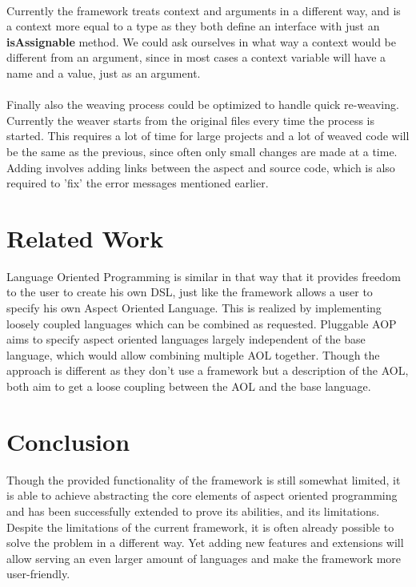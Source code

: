 \documentclass[a4paper]{report}
\begin{document}
\\
Currently the framework treats context and arguments in a different way, and is a context more equal to a type as they both define an interface with just an \textbf{isAssignable} method. We could ask ourselves in what way a context would be different from an argument, since in most cases a context variable will have a name and a value, just as an argument.\\
\\
Finally also the weaving process could be optimized to handle quick re-weaving. Currently the weaver starts from the original files every time the process is started. This requires a lot of time for large projects and a lot of weaved code will be the same as the previous, since often only small changes are made at a time. Adding involves adding links between the aspect and source code, which is also required to 'fix' the error messages mentioned earlier.

\chapter{Related Work}
Language Oriented Programming \citep{dmitriev_language_2004} is similar in that way that it provides freedom to the user to create his own DSL, just like the framework allows a user to specify his own Aspect Oriented Language. This is realized by implementing loosely coupled languages which can be combined as requested. Pluggable AOP \citep{kojarski_pluggable_2005} aims to specify aspect oriented languages largely independent of the base language, which would allow combining multiple AOL together.  Though the approach is different as they don't use a framework but a description of the AOL, both aim to get a loose coupling between the AOL and the base language. 

\chapter{Conclusion}
Though the provided functionality of the framework is still somewhat limited, it is able to achieve abstracting the core elements of aspect oriented programming and has been successfully extended to prove its abilities, and its limitations. Despite the limitations of the current framework, it is often already possible to solve the problem in a different way. Yet adding new features and extensions will allow serving an even larger amount of languages and make the framework more user-friendly.



\end{document}
